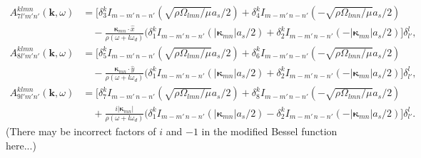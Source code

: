 \documentclass[aps,pre,amsmath,amssymb,floatfix,onecolumn,notitlepage,10pt]{revtex4-1}
\begin{document}
\begin{align}
A^{klmn}_{7l'm'n'}(\mathbf{k}, \omega) &= \Big[ \delta^k_{3} I_{m-m'\, n-n'} \left(\sqrt{\rho\Omega_{lmn}/\mu}a_s/2\right)  + \delta^k_{4} I_{m-m'\, n-n'} \left(-\sqrt{\rho\Omega_{lmn}/\mu}a_s/2\right) \label{lnoslip1}  \nonumber  \\
&\quad - \frac{\bm{\kappa}_{mn}\cdot \hat{x}}{\rho(\omega+l\omega_d)}(\delta^k_{1} I_{m-m'\, n-n'} \left(|\bm{\kappa}_{mn}|a_s/2\right) + \delta^k_{2} I_{m-m'\, n-n'} \left(-|\bm{\kappa}_{mn}|a_s/2\right) \Big]\delta^l_{l'},  \\
A^{klmn}_{8l'm'n'}(\mathbf{k}, \omega) &= \Big[ \delta^k_{5} I_{m-m'\, n-n'} \left(\sqrt{\rho\Omega_{lmn}/\mu}a_s/2\right)  + \delta^k_{6} I_{m-m'\, n-n'} \left(-\sqrt{\rho\Omega_{lmn}/\mu}a_s/2\right)  \nonumber \\
&\quad - \frac{\bm{\kappa}_{mn}\cdot \hat{y}}{\rho(\omega+l\omega_d)}(\delta^k_{1} I_{m-m'\, n-n'} \left(|\bm{\kappa}_{mn}|a_s/2\right) + \delta^k_{2} I_{m-m'\, n-n'} \left(-|\bm{\kappa}_{mn}|a_s/2\right) \Big]\delta^l_{l'},   \label{lnoslip2} \\
A^{klmn}_{9l'm'n'}(\mathbf{k}, \omega) &= \Big[ \delta^k_{7} I_{m-m'\, n-n'} \left(\sqrt{\rho\Omega_{lmn}/\mu}a_s/2\right)  + \delta^k_{8} I_{m-m'\, n-n'} \left(-\sqrt{\rho\Omega_{lmn}/\mu}a_s/2\right) \nonumber \\
&\quad + \frac{i|\bm{\kappa}_{mn}|}{\rho(\omega+l\omega_d)}(\delta^k_{1} I_{m-m'\, n-n'} \left(|\bm{\kappa}_{mn}|a_s/2\right) - \delta^k_{2} I_{m-m'\, n-n'} \left(-|\bm{\kappa}_{mn}|a_s/2\right) \Big]\delta^l_{l'}. \label{lnoslip3}
\end{align}
(There may be incorrect factors of $i$ and $-1$ in the modified Bessel function here...)
\end{document}
